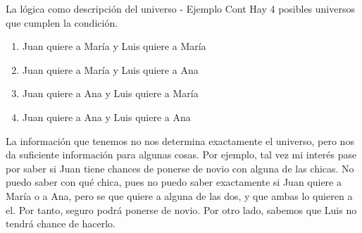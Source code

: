 

\begin{frame}{La lógica como descripción del universo - Ejemplo Cont}
  Hay 4 posibles universos que cumplen la condición.
  \begin{enumerate}
    \item Juan quiere a María y Luis quiere a María
    \item Juan quiere a María y Luis quiere a Ana
    \item Juan quiere a Ana y Luis quiere a María
    \item Juan quiere a Ana y Luis quiere a Ana
  \end{enumerate}
  \jump
  La información que tenemos no nos determina exactamente el universo, pero nos
  da suficiente información para algunas cosas.
  \jump
  Por ejemplo, tal vez mi interés pase por saber si Juan tiene chances de
  ponerse de novio con alguna de las chicas. No puedo saber con qué chica, pues
  no puedo saber exactamente si Juan quiere a María o a Ana, pero se que quiere
  a alguna de las dos, y que ambas lo quieren a el. Por tanto, seguro podrá
  ponerse de novio. Por otro lado, sabemos que Luis no tendrá chance de hacerlo.
\end{frame}

